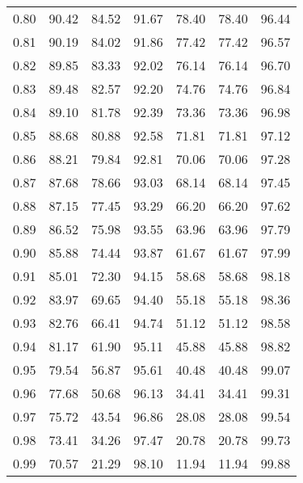 \begin{tabular}{|c|c|c|c|c|c|c|}
      0.80 &     90.42 &     84.52 &      91.67 &   78.40 &      78.40 &         96.44 \\
      0.81 &     90.19 &     84.02 &      91.86 &   77.42 &      77.42 &         96.57 \\
      0.82 &     89.85 &     83.33 &      92.02 &   76.14 &      76.14 &         96.70 \\
      0.83 &     89.48 &     82.57 &      92.20 &   74.76 &      74.76 &         96.84 \\
      0.84 &     89.10 &     81.78 &      92.39 &   73.36 &      73.36 &         96.98 \\
      0.85 &     88.68 &     80.88 &      92.58 &   71.81 &      71.81 &         97.12 \\
      0.86 &     88.21 &     79.84 &      92.81 &   70.06 &      70.06 &         97.28 \\
      0.87 &     87.68 &     78.66 &      93.03 &   68.14 &      68.14 &         97.45 \\
      0.88 &     87.15 &     77.45 &      93.29 &   66.20 &      66.20 &         97.62 \\
      0.89 &     86.52 &     75.98 &      93.55 &   63.96 &      63.96 &         97.79 \\
      0.90 &     85.88 &     74.44 &      93.87 &   61.67 &      61.67 &         97.99 \\
      0.91 &     85.01 &     72.30 &      94.15 &   58.68 &      58.68 &         98.18 \\
      0.92 &     83.97 &     69.65 &      94.40 &   55.18 &      55.18 &         98.36 \\
      0.93 &     82.76 &     66.41 &      94.74 &   51.12 &      51.12 &         98.58 \\
      0.94 &     81.17 &     61.90 &      95.11 &   45.88 &      45.88 &         98.82 \\
      0.95 &     79.54 &     56.87 &      95.61 &   40.48 &      40.48 &         99.07 \\
      0.96 &     77.68 &     50.68 &      96.13 &   34.41 &      34.41 &         99.31 \\
      0.97 &     75.72 &     43.54 &      96.86 &   28.08 &      28.08 &         99.54 \\
      0.98 &     73.41 &     34.26 &      97.47 &   20.78 &      20.78 &         99.73 \\
      0.99 &     70.57 &     21.29 &      98.10 &   11.94 &      11.94 &         99.88 \\
\bottomrule
\end{tabular}
